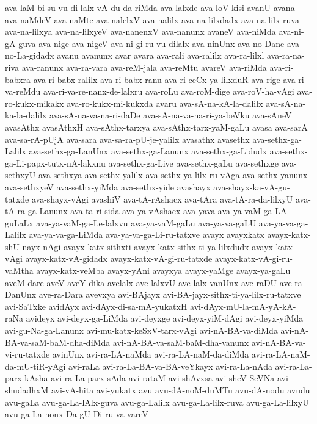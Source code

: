 {ava-laM-bi-su-vu-di-lalx-vA-du-da-riMda
ava-lalxde
ava-loV-kisi
avanU
avana
ava-naMdeV
ava-naMte
ava-nalelxV
ava-nalilx
ava-na-lilxdadx
ava-na-lilx-ruva
ava-na-lilxya
ava-na-lilxyeV
ava-nanenxV
ava-nanunx
avaneV
ava-niMda
ava-ni-gA-guva
ava-nige
ava-nigeV
ava-ni-gi-ru-vu-dilalx
ava-ninUnx
ava-no-Dane
ava-no-La-gidadx
avanu
avanunx
avar
avara
ava-rali
ava-ralilx
ava-ra-lilxl
ava-ra-na-riva
ava-ranunx
ava-ra-vara
ava-reM-jala
ava-reMtu
avareV
ava-riMda
ava-ri-babxra
ava-ri-babx-ralilx
ava-ri-babx-ranu
ava-ri-ceCx-ya-lilxduR
ava-rige
ava-ri-va-reMdu
ava-ri-va-re-nanx-de-lalxru
ava-roLu
ava-roM-dige
ava-roV-ha-vAgi
ava-ro-kukx-mikakx
ava-ro-kukx-mi-kukxda
avaru
ava-sA-na-kA-la-dalilx
ava-sA-na-ka-la-dalilx
ava-sA-na-va-na-ri-daDe
ava-sA-na-va-na-ri-ya-beVku
ava-sAneV
avasAthx
avasAthxH
ava-sAthx-tarxya
ava-sAthx-tarx-yaM-gaLu
avasa
ava-sarA
ava-sa-rA-pUjA
ava-sara
ava-sa-ra-pU-je-yalilx
avasathx
avasethx
ava-sethx-ga-Lalilx
ava-sethx-ga-LanUnx
ava-sethx-ga-Lanunx
ava-sethx-ga-Lidudx
ava-sethx-ga-Li-papx-tutx-nA-lakxnu
ava-sethx-ga-Live
ava-sethx-gaLu
ava-sethxge
ava-sethxyU
ava-sethxya
ava-sethx-yalilx
ava-sethx-ya-lilx-ru-vAga
ava-sethx-yanunx
ava-sethxyeV
ava-sethx-yiMda
ava-sethx-yide
avashayx
ava-shayx-ka-vA-gu-tatxde
ava-shayx-vAgi
avashiV
ava-tA-rAshacx
ava-tAra
ava-tA-ra-da-lilxyU
ava-tA-ra-ga-Lanunx
ava-ta-ri-sida
ava-ya-vAshacx
ava-yava
ava-ya-vaM-ga-LA-guLaLx
ava-ya-vaM-ga-Le-lalxvu
ava-ya-vaM-gaLu
ava-ya-va-gaLU
ava-ya-va-ga-Lalilx
ava-ya-va-ga-LiMda
ava-ya-va-ga-Li-ru-tatxve
avayx
avayxkatx
avayx-katx-shU-nayx-nAgi
avayx-katx-sithxti
avayx-katx-sithx-ti-ya-lilxdudx
avayx-katx-vAgi
avayx-katx-vA-gidadx
avayx-katx-vA-gi-ru-tatxde
avayx-katx-vA-gi-ru-vaMtha
avayx-katx-veMba
avayx-yAni
avayxya
avayx-yaMge
avayx-ya-gaLu
aveM-dare
aveV
aveY-dika
avelalx
ave-lalxvU
ave-lalx-vanUnx
ave-raDU
ave-ra-DanUnx
ave-ra-Dara
avevxya
avi-BAjayx
avi-BA-jayx-sithx-ti-ya-lilx-ru-tatxve
avi-SaTxke
avidAyx
avi-dAyx-di-sa-mA-yukatxH
avi-dAyx-mU-la-mA-yA-kA-raNa
avideyx
avi-deyx-ga-LiMda
avi-deyxge
avi-deyx-yiM-dAgi
avi-deyx-yiMda
avi-gu-Na-ga-Lanunx
avi-mu-katx-keSxV-tarx-vAgi
avi-nA-BA-va-diMda
avi-nA-BA-va-saM-baM-dha-diMda
avi-nA-BA-va-saM-baM-dha-vanunx
avi-nA-BA-va-vi-ru-tatxde
avinUnx
avi-ra-LA-naMda
avi-ra-LA-naM-da-diMda
avi-ra-LA-naM-da-mU-tiR-yAgi
avi-raLa
avi-ra-La-BA-va-BA-veYkayx
avi-ra-La-nAda
avi-ra-La-parx-kAsha
avi-ra-La-parx-sAda
avi-rataM
avi-shAvxsa
avi-sheV-SeVNa
avi-shudadhxM
avi-vA-hita
avi-yukatx
avu
avu-dA-noM-duMTu
avu-dA-nodu
avudu
avu-gaLa
avu-ga-La-lAlx-guva
avu-ga-Lalilx
avu-ga-La-lilx-ruva
avu-ga-La-lilxyU
avu-ga-La-nonx-Da-gU-Di-ru-va-vareV
}
